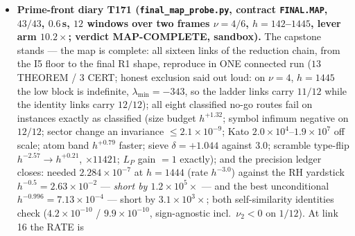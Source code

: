 \documentclass[11pt]{article}
\begin{document}
\begin{itemize}[leftmargin=1.5em]
$2\times2$ Lagrange identity ($\sin\angle=1.169\times10^{-4}$--$2.467\times10^{-3}
\le10^{-2}$ per window; \emph{rate and quantifier typed OPEN}). \emph{The no-go
battery}, $8/8$ failing as classified (size budget $\times2.7\times10^{3}$--$1.6\times
10^{4}$; symbol infimum $<0$ on $12/12$; sector invariance; perturbation scale; atom
band dominates; sieve operator-norm $\times8.8\times10^{3}$--$7.5\times10^{4}$;
scramble $\times679$ median with rank-3 untouched on $60$ draws; $L_P$ gain $=1$
exactly). \emph{The precision ledger}: needed $2.752\times10^{-4}$ at the deepest
window --- finer than the RH yardstick $h^{-0.5}$ by $215\times$ and the best
unconditional $h^{-0.996}$ by $13\times$ on this surface; both self-similarity
identities $\le6.8\times10^{-13}$; mutation controls fail loudly. ZERO new
uniform-in-$m$ statements; the one open phase-2 object R1 explicitly typed OPEN; NO RH
statement (RH\_DELTA $=0.5$ a yardstick in exactly one role); Weil fence documented
(link 14 R4-free by construction). Ledger row \texttt{PRIME.PHASE2.CAPSTONE.01};
registered in \texttt{run\_all.py} and \texttt{script\_registry.csv}; suite counter
$552\to553$ scripts.
\item \textbf{Prime-front diary T171 (\texttt{final\_map\_probe.py}, contract
\texttt{FINAL.MAP}, $43/43$, $0.6$\,s, $12$ windows over two frames $\nu=4/6$,
$h=142$--$1445$, lever arm $10.2\times$; verdict MAP-COMPLETE, sandbox).} The capstone
stands --- the map is complete: all sixteen links of the reduction chain, from the I5
floor to the final R1 shape, reproduce in ONE connected run ($13$ THEOREM / $3$ CERT;
honest exclusion said out loud: on $\nu=4$, $h=1445$ the low block is indefinite,
$\lambda_{\min}=-343$, so the ladder links carry $11/12$ while the identity links carry
$12/12$); all eight classified no-go routes fail on instances exactly as classified
(size budget $h^{+1.32}$; symbol infimum negative on $12/12$; sector change an
invariance $\le2.1\times10^{-9}$; Kato $2.0\times10^{4}$--$1.9\times10^{7}$ off scale;
atom band $h^{+0.79}$ faster; sieve $\delta=+1.044$ against $3.0$; scramble type-flip
$h^{-2.57}\to h^{+0.21}$, $\times11421$; $L_P$ gain $=1$ exactly); and the precision
ledger closes: needed $2.284\times10^{-7}$ at $h=1444$ (rate $h^{-3.0}$) against the
RH yardstick $h^{-0.5}=2.63\times10^{-2}$ --- \emph{short by $1.2\times10^{5}\times$}
--- and the best unconditional $h^{-0.996}=7.13\times10^{-4}$ --- short by
$3.1\times10^{3}\times$; both self-similarity identities check ($4.2\times10^{-10}$ /
$9.9\times10^{-10}$, sign-agnostic incl.\ $\nu_2<0$ on $1/12$). At link 16 the RATE is

\end{itemize}
\end{document}
